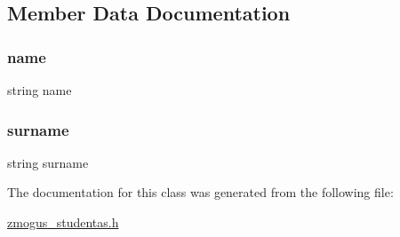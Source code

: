 \subsection{Member Data Documentation}
\mbox{\label{classPerson_a8ccf841cb59e451791bcb2e1ac4f1edc}} 
\subsubsection{\texorpdfstring{name}{name}}
{\footnotesize\ttfamily string name\hspace{0.3cm}{\ttfamily [protected]}}

\mbox{\label{classPerson_acb03bac0d1d003c3c1a88da1524d2c3a}} 
\subsubsection{\texorpdfstring{surname}{surname}}
{\footnotesize\ttfamily string surname\hspace{0.3cm}{\ttfamily [protected]}}



The documentation for this class was generated from the following file\+:\begin{DoxyCompactItemize}
\item 
\mbox{\hyperlink{zmogus__studentas_8h}{zmogus\+\_\+studentas.\+h}}\end{DoxyCompactItemize}
